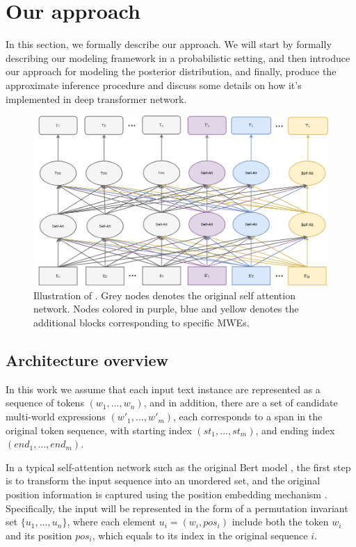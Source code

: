

\section{Our approach}\label{sec:bert_mwe_approach}
In this section, we formally describe our \BertMWE approach.
We will start by formally describing our modeling framework in a probabilistic setting, 
and then introduce our approach for modeling the posterior distribution, 
and finally, produce the approximate inference procedure
and discuss some details on how it's implemented in deep transformer network.


\begin{figure}[tb]
    \centering
    \includegraphics[width=0.95\linewidth]{fig/architecture.png}
    \vspace{20pt}
    \caption{Illustration of \BertMWE. Grey nodes denotes the original self attention network. Nodes colored in purple, blue and yellow denotes the additional blocks corresponding to specific MWEs.}
    \vspace{10pt}
    \label{fig:variational}
\end{figure}


\subsection{Architecture overview}\label{sec:arch-overview}
In this work we assume that each input text instance are represented as a sequence of tokens $(w_1, ..., w_n)$,
and in addition, there are a set of candidate multi-world expressions $(w'_1, ..., w'_m)$, each corresponds to a span in the original token sequence, with starting index $(st_1, ..., st_m)$, and ending index $(end_1, ..., end_m)$. 

In a typical self-attention network such as the original Bert model \cite{devlin2018bert}, the first step is to transform the input sequence into an unordered set, 
and the original position information is captured using the position embedding mechanism \cite{vaswani2017attention}. Specifically, the  input will be represented in the form of a permutation invariant set $\{u_1, ..., u_n\}$, where each element $u_i=(w_i, pos_i)$ include both the token $w_i$ and its position $pos_i$, which equals to its index in the original sequence $i$.

